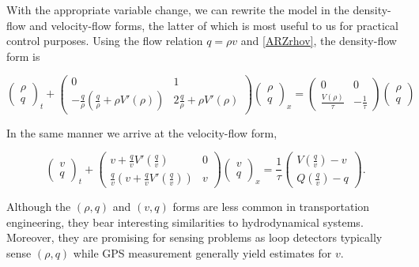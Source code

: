 \documentclass[5p,twocolumn]{elsarticle}
\begin{document}
With the appropriate variable change, we can rewrite the model in the density-flow and velocity-flow forms, the latter of which is most useful to us for practical control purposes. Using the flow relation $q = \rho v$ and \eqref{ARZrhov}, the density-flow form is

{
\footnotesize
\begin{equation} \label{ARZrhoq}
\begin{pmatrix}
\rho \\ q
\end{pmatrix}_t
+ \begin{pmatrix}
0 & 1 \\
-\frac{q}{\rho} \left(\frac{q}{\rho} + \rho V'(\rho) \right) & 2\frac{q}{\rho} + \rho V'(\rho) 
\end{pmatrix}
\begin{pmatrix}
\rho \\ q
\end{pmatrix}_x = 
\begin{pmatrix}
0 & 0 \\ 
\frac{V(\rho)}{\tau} & -\frac{1}{\tau}
\end{pmatrix} 
\begin{pmatrix}
\rho \\ q
\end{pmatrix}
\end{equation}
}

In the same manner we arrive at the velocity-flow form,

{
\footnotesize
\begin{equation} \label{ARZvq}
\begin{pmatrix}
v \\ q
\end{pmatrix}_t
+ \begin{pmatrix}
v + \frac{q}{v} V'\left(\frac{q}{v}\right) & 0 \\
\frac{q}{v} \left( v + \frac{q}{v} V'\left(\frac{q}{v}\right)\right) & v
\end{pmatrix}
\begin{pmatrix}
v \\ q
\end{pmatrix}_x = 
\dfrac{1}{\tau}
\begin{pmatrix}
V\left( \frac{q}{v}\right) - v \\
Q\left( \frac{q}{v}\right) - q
\end{pmatrix}.
\end{equation}
}

Although the $\left(\rho, q\right)$ and $\left(v, q\right)$ forms are less common in transportation engineering, they bear interesting similarities to hydrodynamical systems. Moreover, they are promising for sensing problems as loop detectors typically sense $\left(\rho, q\right)$ while GPS measurement generally yield estimates for $v$.
\end{document}
